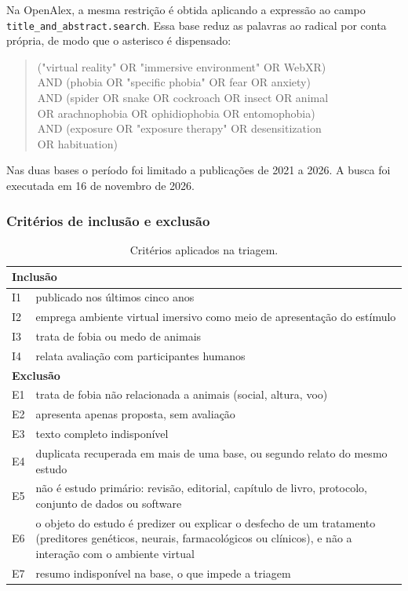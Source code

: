 Na OpenAlex, a mesma restrição é obtida aplicando a expressão ao campo
\texttt{title\_and\_abstract.search}. Essa base reduz as palavras ao
radical por conta própria, de modo que o asterisco é dispensado:

\begin{quote}\footnotesize\singlespacing\ttfamily
("virtual reality" OR "immersive environment" OR WebXR)\\
AND (phobia OR "specific phobia" OR fear OR anxiety)\\
AND (spider OR snake OR cockroach OR insect OR animal\\
\phantom{xxxxx}OR arachnophobia OR ophidiophobia OR entomophobia)\\
AND (exposure OR "exposure therapy" OR desensitization\\
\phantom{xxxxx}OR habituation)
\end{quote}

Nas duas bases o período foi limitado a publicações de 2021 a 2026. A
busca foi executada em 16 de novembro de 2026.

\subsubsection{Critérios de inclusão e exclusão}

\begin{table}[htbp]
\centering
\caption{Critérios aplicados na triagem.}
\label{tab:criterios}
\begin{tabular}{p{1.0cm}p{12.0cm}}
\toprule
\multicolumn{2}{l}{\textbf{Inclusão}} \\
\midrule
I1 & publicado nos últimos cinco anos \\
I2 & emprega ambiente virtual imersivo como meio de apresentação do estímulo \\
I3 & trata de fobia ou medo de animais \\
I4 & relata avaliação com participantes humanos \\
\midrule
\multicolumn{2}{l}{\textbf{Exclusão}} \\
\midrule
E1 & trata de fobia não relacionada a animais (social, altura, voo) \\
E2 & apresenta apenas proposta, sem avaliação \\
E3 & texto completo indisponível \\
E4 & duplicata recuperada em mais de uma base, ou segundo relato do
mesmo estudo \\
E5 & não é estudo primário: revisão, editorial, capítulo de livro,
protocolo, conjunto de dados ou software \\
E6 & o objeto do estudo é predizer ou explicar o desfecho de um
tratamento (preditores genéticos, neurais, farmacológicos ou clínicos),
e não a interação com o ambiente virtual \\
E7 & resumo indisponível na base, o que impede a triagem \\
\bottomrule
\end{tabular}
\end{table}

